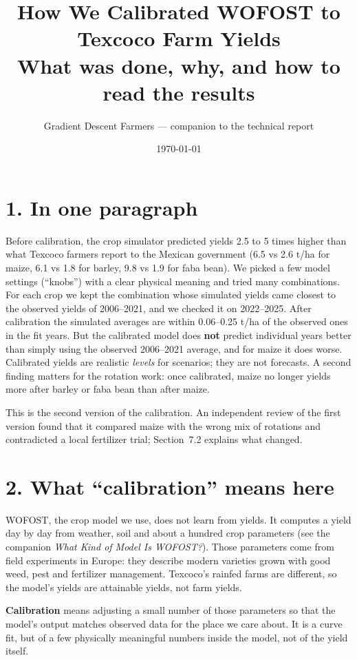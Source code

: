 \documentclass[11pt,a4paper]{article}
\title{How We Calibrated WOFOST to Texcoco Farm Yields\\[0.3em]\large What was done, why, and how to read the results}
\author{Gradient Descent Farmers --- companion to the technical report}
\date{\today}
\begin{document}
\maketitle

\section*{1. In one paragraph}

Before calibration, the crop simulator predicted yields 2.5 to 5 times higher than what Texcoco farmers report to the
Mexican government (6.5 vs 2.6 t/ha for maize, 6.1 vs 1.8 for barley, 9.8 vs 1.9 for faba bean). We picked a few
model settings (``knobs'') with a clear physical meaning and tried many combinations. For each crop we kept the
combination whose simulated yields came closest to the observed yields of 2006--2021, and we checked it on 2022--2025.
After calibration the simulated averages are within 0.06--0.25 t/ha of the observed ones in the fit years. But the
calibrated model does \textbf{not} predict individual years better than simply using the observed 2006--2021
average, and for maize it does worse. Calibrated yields are realistic \emph{levels} for scenarios; they are not
forecasts. A second finding matters for the rotation work: once calibrated, maize no longer yields more after barley
or faba bean than after maize.

This is the second version of the calibration. An independent review of the first version found that it compared
maize with the wrong mix of rotations and contradicted a local fertilizer trial; Section~7.2 explains what changed.

\section*{2. What ``calibration'' means here}

WOFOST, the crop model we use, does not learn from yields. It computes a yield day by day from weather, soil and
about a hundred crop parameters (see the companion \emph{What Kind of Model Is WOFOST?}). Those parameters come from
field experiments in Europe: they describe modern varieties grown with good weed, pest and fertilizer management.
Texcoco's rainfed farms are different, so the model's yields are attainable yields, not farm yields.

\textbf{Calibration} means adjusting a small number of those parameters so that the model's output matches observed
data for the place we care about. It is a curve fit, but of a few physically meaningful numbers inside the model,
not of the yield itself.
\end{document}
